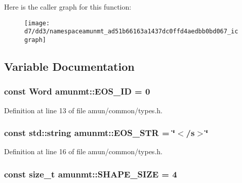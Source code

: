 Here is the caller graph for this function\+:
\nopagebreak
\begin{figure}[H]
\begin{center}
\leavevmode
\texttt{[image: d7/dd3/namespaceamunmt\_ad51b66163a1437dc0ffd4aedbb0bd067\_icgraph]}
\end{center}
\end{figure}




\subsection{Variable Documentation}
\subsubsection[{\texorpdfstring{E\+O\+S\+\_\+\+ID}{EOS_ID}}]{\setlength{\rightskip}{0pt plus 5cm}const {\bf Word} amunmt\+::\+E\+O\+S\+\_\+\+ID = 0}\hypertarget{namespaceamunmt_a89f3b34944649f2108f2b8935e5f46dd}{}\label{namespaceamunmt_a89f3b34944649f2108f2b8935e5f46dd}


Definition at line 13 of file amun/common/types.\+h.

\subsubsection[{\texorpdfstring{E\+O\+S\+\_\+\+S\+TR}{EOS_STR}}]{\setlength{\rightskip}{0pt plus 5cm}const std\+::string amunmt\+::\+E\+O\+S\+\_\+\+S\+TR = \char`\"{}$<$/s$>$\char`\"{}}\hypertarget{namespaceamunmt_a396941d367e0babddc9fa87260a805f7}{}\label{namespaceamunmt_a396941d367e0babddc9fa87260a805f7}


Definition at line 16 of file amun/common/types.\+h.

\subsubsection[{\texorpdfstring{S\+H\+A\+P\+E\+\_\+\+S\+I\+ZE}{SHAPE_SIZE}}]{\setlength{\rightskip}{0pt plus 5cm}const size\+\_\+t amunmt\+::\+S\+H\+A\+P\+E\+\_\+\+S\+I\+ZE = 4}\hypertarget{namespaceamunmt_a0c4d3d7c0b1b52dbe7a658b3dc026409}{}\label{namespaceamunmt_a0c4d3d7c0b1b52dbe7a658b3dc026409}


